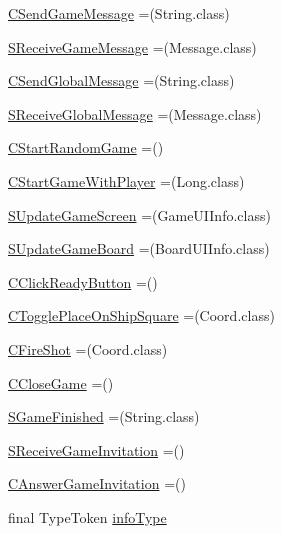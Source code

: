 \begin{DoxyCompactItemize}
\hyperlink{enumpt_1_1up_1_1fe_1_1lpro1613_1_1sharedlib_1_1conn_1_1_query_a73b9f9a48ed316b294a1ed7f6b08fed0}{C\+Send\+Game\+Message} =(String.\+class)
\item 
\hyperlink{enumpt_1_1up_1_1fe_1_1lpro1613_1_1sharedlib_1_1conn_1_1_query_a65a9da6e31cb2ae51cfb5a5a301fbef0}{S\+Receive\+Game\+Message} =(Message.\+class)
\item 
\hyperlink{enumpt_1_1up_1_1fe_1_1lpro1613_1_1sharedlib_1_1conn_1_1_query_a3a8111ba44393eb51bf1152e00787cae}{C\+Send\+Global\+Message} =(String.\+class)
\item 
\hyperlink{enumpt_1_1up_1_1fe_1_1lpro1613_1_1sharedlib_1_1conn_1_1_query_a4e96d71faf614eae02250fd53ea20382}{S\+Receive\+Global\+Message} =(Message.\+class)
\item 
\hyperlink{enumpt_1_1up_1_1fe_1_1lpro1613_1_1sharedlib_1_1conn_1_1_query_a95b2061a9c70c464a4e75dc4cb3e600e}{C\+Start\+Random\+Game} =()
\item 
\hyperlink{enumpt_1_1up_1_1fe_1_1lpro1613_1_1sharedlib_1_1conn_1_1_query_a4e8ad00082033bfe9dc8a17424de7a04}{C\+Start\+Game\+With\+Player} =(Long.\+class)
\item 
\hyperlink{enumpt_1_1up_1_1fe_1_1lpro1613_1_1sharedlib_1_1conn_1_1_query_a1b59fac92875e1e89cbc97a4f98b7752}{S\+Update\+Game\+Screen} =(Game\+U\+I\+Info.\+class)
\item 
\hyperlink{enumpt_1_1up_1_1fe_1_1lpro1613_1_1sharedlib_1_1conn_1_1_query_ad1ad8328d07097e117b7d7e9acae578c}{S\+Update\+Game\+Board} =(Board\+U\+I\+Info.\+class)
\item 
\hyperlink{enumpt_1_1up_1_1fe_1_1lpro1613_1_1sharedlib_1_1conn_1_1_query_adf41fb6a24eb0a73a98ffdf2b6875e6a}{C\+Click\+Ready\+Button} =()
\item 
\hyperlink{enumpt_1_1up_1_1fe_1_1lpro1613_1_1sharedlib_1_1conn_1_1_query_a5c0bd26ac65c768329e1812a5c6ecc9e}{C\+Toggle\+Place\+On\+Ship\+Square} =(Coord.\+class)
\item 
\hyperlink{enumpt_1_1up_1_1fe_1_1lpro1613_1_1sharedlib_1_1conn_1_1_query_a3b97368feda50d38cc47f9ccffcd8695}{C\+Fire\+Shot} =(Coord.\+class)
\item 
\hyperlink{enumpt_1_1up_1_1fe_1_1lpro1613_1_1sharedlib_1_1conn_1_1_query_a5d1ed333957b4a3453303db0341aac29}{C\+Close\+Game} =()
\item 
\hyperlink{enumpt_1_1up_1_1fe_1_1lpro1613_1_1sharedlib_1_1conn_1_1_query_aca594101e00b7d1c778971dbc57ef432}{S\+Game\+Finished} =(String.\+class)
\item 
\hyperlink{enumpt_1_1up_1_1fe_1_1lpro1613_1_1sharedlib_1_1conn_1_1_query_ac7b851d120b1903b63a14053166ca2a8}{S\+Receive\+Game\+Invitation} =()
\item 
\hyperlink{enumpt_1_1up_1_1fe_1_1lpro1613_1_1sharedlib_1_1conn_1_1_query_a05335746d2327f5ad8b977eb6d491635}{C\+Answer\+Game\+Invitation} =()
\item 
final Type\+Token \hyperlink{enumpt_1_1up_1_1fe_1_1lpro1613_1_1sharedlib_1_1conn_1_1_query_a60697d643fb2c864d73b2ebc73573325}{info\+Type}
\end{DoxyCompactItemize}



